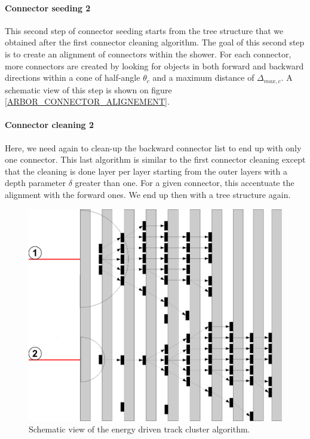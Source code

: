 \documentclass[cits]{JINST}
\begin{document}
\paragraph*{Connector seeding 2} This second step of connector seeding starts from the tree structure that we obtained after the first connector cleaning algorithm. The goal of this second step is to create an alignment of connectors within the shower. For each connector, more connectors are created by looking for objects in both forward and backward directions within a cone of half-angle $\theta_c$ and a maximum distance of $\Delta_{max,c}$. A schematic view of this step is shown on figure \ref{ARBOR_CONNECTOR_ALIGNEMENT}.

\paragraph*{Connector cleaning 2} Here, we need again to clean-up the backward connector list to end up with only one connector. This last algorithm is similar to the first connector cleaning except that the cleaning is done layer per layer starting from the outer layers with a depth parameter $\delta$ greater than one. For a given connector, this accentuate the alignment with the forward ones. We end up then with a tree structure again.

\begin{figure}
  \vspace{-20pt}
  \begin{center}
    \includegraphics[width=\linewidth]{EnergyDrivenTrackClusterAssociation.pdf}
  \end{center}
  \vspace{-5pt}
  \caption{\label{ARBOR_ENERGY_DRIVEN_TRACK_CLUSTER_ASSOCIATION} Schematic view of the energy driven track cluster algorithm.}
  \vspace{-30pt}
\end{figure}
\end{document}
